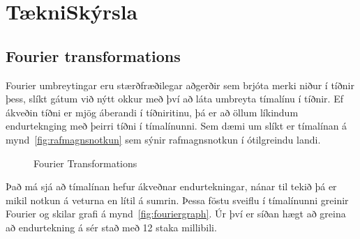 \documentclass{article}
\begin{document}
\section{TækniSkýrsla}


\subsection{Fourier transformations} 

Fourier umbreytingar eru stærðfræðilegar aðgerðir
sem brjóta merki niður í tíðnir þess, slíkt gátum við nýtt okkur með því að láta
umbreyta tímalínu í tíðnir. 
Ef ákveðin tíðni er mjög áberandi í tíðniritinu, þá er að öllum líkindum endurteknging með þeirri tíðni í tímalínunni. 
Sem dæmi um slíkt er tímalínan á mynd~\ref{fig:rafmagnsnotkun} sem sýnir rafmagnsnotkun í ótilgreindu landi.


\begin{figure}[H]
  \centering
  \caption{Fourier Transformations}
  \label{fig:fourier}
\end{figure}

Það má sjá að tímalínan hefur ákveðnar endurtekningar,
nánar til tekið þá er mikil notkun á veturna en lítil á
sumrin.
Þessa föstu sveiflu í tímalínunni greinir Fourier og
skilar grafi á mynd~\ref{fig:fouriergraph}. 
Úr því er síðan hægt að greina að endurtekning á sér stað með 12 staka millibili.
\end{document}
